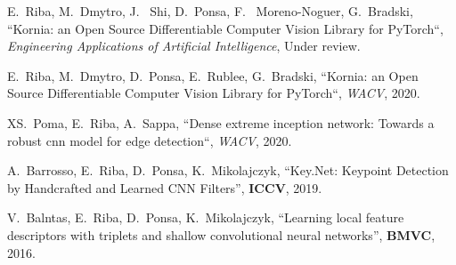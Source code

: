 E.~Riba, M.~Dmytro, J.~ Shi, D.~Ponsa, F.~ Moreno-Noguer, G.~Bradski, ``Kornia: an Open Source Differentiable Computer Vision Library for PyTorch``, \textit{Engineering Applications of Artificial Intelligence}, Under review.

E.~Riba, M.~Dmytro, D.~Ponsa, E.~Rublee, G.~Bradski, ``Kornia: an Open Source Differentiable Computer Vision Library for PyTorch``, \textit{WACV}, 2020.

XS.~Poma, E.~Riba, A.~Sappa, ``Dense extreme inception network: Towards a robust cnn model for edge detection``, \textit{WACV}, 2020.

A.~Barrosso, E.~Riba, D.~Ponsa, K.~Mikolajczyk, ``Key.Net: Keypoint Detection by Handcrafted and Learned CNN Filters'', \textbf{ICCV}, 2019.

V.~Balntas, E.~Riba, D.~Ponsa, K.~Mikolajczyk, ``Learning local feature descriptors with triplets and shallow convolutional neural networks'', \textbf{BMVC}, 2016.
